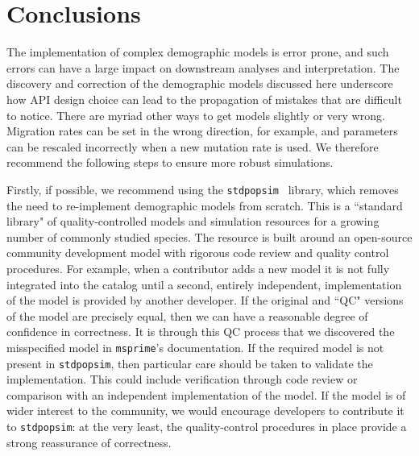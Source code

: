 \documentclass{article}
\newcommand{\msprime}[0]{\texttt{msprime}}
\newcommand{\stdpopsim}[0]{\texttt{stdpopsim}}
\begin{document}
\section*{Conclusions}

The implementation of complex demographic models is error prone, and such errors
can have a large impact on downstream analyses and interpretation.
The discovery and correction of the demographic models discussed here underscore
how API design choice can lead to the propagation of mistakes that are difficult to notice.
There are myriad other ways to get models slightly or very wrong. Migration
rates can be set in the wrong direction, for example, and parameters can be
rescaled incorrectly when a new mutation rate is used.
We therefore recommend the following steps to ensure more robust simulations.

Firstly, if possible, we recommend using the \stdpopsim~\citep{adrion2019community}
library, which removes the need to re-implement demographic models from scratch.
This is a ``standard library" of quality-controlled
models and simulation resources for a growing number of commonly studied species.
The resource is built around an open-source community development model
with rigorous code review and quality control procedures.
For example, when a contributor adds a new model it is not fully integrated
into the catalog until a second, entirely independent, implementation of the
model is provided by another developer. If the original and ``QC" versions
of the model are precisely equal, then we can have a reasonable degree
of confidence in correctness. It is through this QC process that we discovered
the misspecified model in \msprime's documentation.
If the required model is not present in \stdpopsim, then particular care should
be taken to validate the implementation.
This could include verification through code review or comparison with an
independent implementation of the model. If the model is of wider interest to
the community, we would encourage developers to contribute it to \stdpopsim:
at the very least, the quality-control procedures in place provide a strong
reassurance of correctness.
\end{document}
